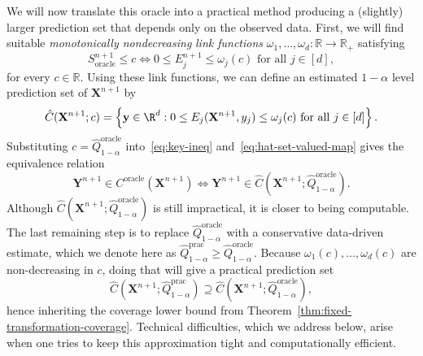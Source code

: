 {We will now translate this oracle into a practical method producing a (slightly) larger prediction set that depends only on the observed data. 
First, we will find suitable {\em monotonically nondecreasing} {\em link functions} $\omega_1, \ldots, \omega_d : \mathbb{R} \to \mathbb{R}_+$ satisfying 
\begin{equation}
S_{\mathrm{oracle}}^{n+1} \le c 
\iff 
0\leq {E}^{n+1}_j \le \omega_j(c)\text{ for all } j \in [d],
\label{eq:key-ineq}
\end{equation}
for every $c \in \mathbb{R}$. Using these link functions, we can define an estimated $1-\alpha$ level prediction set of $\mathbf{X}^{n+1}$ by
\begin{equation}
\hat{C}(\mathbf{X}^{n+1}; c) = \left\{\mathbf y \in \R^d: 0\leq E_j(\mathbf{X}^{n+1}, y_j) \leq \omega_j(c)\text{ for all } j \in [d]\right\}.  
\label{eq:hat-set-valued-map}
\end{equation}
Substituting $c = \hat{Q}^{\mathrm{oracle}}_{1-\alpha}$ into~\eqref{eq:key-ineq} and~\eqref{eq:hat-set-valued-map} gives the equivalence relation
\begin{equation} \label{eq:oracle-dual}
\mathbf{Y}^{n+1} \in {C}^{\mathrm{oracle}}(\mathbf{X}^{n+1}) \iff \mathbf{Y}^{n+1} \in \hat{C}(\mathbf{X}^{n+1}; \hat{Q}^{\mathrm{oracle}}_{1-\alpha}).
\end{equation}
Although $\hat{C}(\mathbf{X}^{n+1}; \hat{Q}^{\mathrm{oracle}}_{1-\alpha})$ is still impractical, it is closer to being computable.
The last remaining step is to replace $\hat{Q}^{\mathrm{oracle}}_{1-\alpha}$ with a conservative data-driven estimate, which we denote here as $\hat{Q}^\mathrm{prac}_{1-\alpha} \geq \hat{Q}^{\mathrm{oracle}}_{1-\alpha}$. Because $\omega_1(c),\ldots,\omega_d(c)$ are non-decreasing in $c$, doing that will give a practical prediction set
\begin{equation} \label{eq:trans-oracle-upper-bound}
\hat{C}(\mathbf{X}^{n+1}; \hat{Q}^\mathrm{prac}_{1-\alpha})
\supseteq \hat{C}(\mathbf{X}^{n+1}; \hat{Q}^{\mathrm{oracle}}_{1-\alpha}),
\end{equation}
hence inheriting the coverage lower bound from Theorem~\ref{thm:fixed-transformation-coverage}.}
Technical difficulties, which we address below, arise when one tries to keep this approximation tight and computationally efficient.

